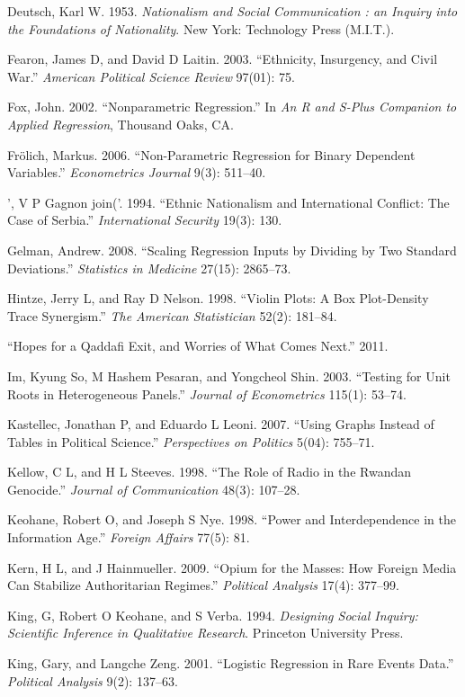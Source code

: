 \documentclass[11pt,article,oneside]{memoir}
\begin{document}
Deutsch, Karl W. 1953. \emph{Nationalism and Social Communication : an
Inquiry into the Foundations of Nationality}. New York: Technology Press
(M.I.T.).

Fearon, James D, and David D Laitin. 2003. ``Ethnicity, Insurgency, and
Civil War.'' \emph{American Political Science Review} 97(01): 75.

Fox, John. 2002. ``Nonparametric Regression.'' In \emph{An R and S-Plus
Companion to Applied Regression}, Thousand Oaks, CA.

Fr{ö}lich, Markus. 2006. ``Non-Parametric Regression for Binary
Dependent Variables.'' \emph{Econometrics Journal} 9(3): 511--40.

', V P Gagnon join('. 1994. ``Ethnic Nationalism and International
Conflict: The Case of Serbia.'' \emph{International Security} 19(3):
130.

Gelman, Andrew. 2008. ``Scaling Regression Inputs by Dividing by Two
Standard Deviations.'' \emph{Statistics in Medicine} 27(15): 2865--73.

Hintze, Jerry L, and Ray D Nelson. 1998. ``Violin Plots: A Box
Plot-Density Trace Synergism.'' \emph{The American Statistician} 52(2):
181--84.

``Hopes for a Qaddafi Exit, and Worries of What Comes Next.'' 2011.

Im, Kyung So, M Hashem Pesaran, and Yongcheol Shin. 2003. ``Testing for
Unit Roots in Heterogeneous Panels.'' \emph{Journal of Econometrics}
115(1): 53--74.

Kastellec, Jonathan P, and Eduardo L Leoni. 2007. ``Using Graphs Instead
of Tables in Political Science.'' \emph{Perspectives on Politics} 5(04):
755--71.

Kellow, C L, and H L Steeves. 1998. ``The Role of Radio in the Rwandan
Genocide.'' \emph{Journal of Communication} 48(3): 107--28.

Keohane, Robert O, and Joseph S Nye. 1998. ``Power and Interdependence
in the Information Age.'' \emph{Foreign Affairs} 77(5): 81.

Kern, H L, and J Hainmueller. 2009. ``Opium for the Masses: How Foreign
Media Can Stabilize Authoritarian Regimes.'' \emph{Political Analysis}
17(4): 377--99.

King, G, Robert O Keohane, and S Verba. 1994. \emph{Designing Social
Inquiry: Scientific Inference in Qualitative Research}. Princeton
University Press.

King, Gary, and Langche Zeng. 2001. ``Logistic Regression in Rare Events
Data.'' \emph{Political Analysis} 9(2): 137--63.
\end{document}
